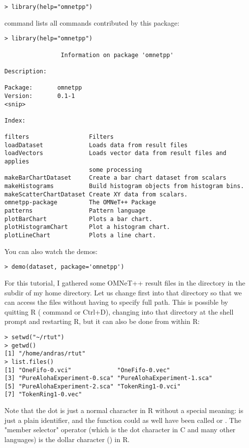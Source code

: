 \begin{verbatim}
> library(help="omnetpp")
\end{verbatim}

command lists all commands contributed by this package:

\begin{verbatim}
> library(help="omnetpp")

                Information on package 'omnetpp'

Description:

Package:       omnetpp
Version:       0.1-1
<snip>

Index:

filters                 Filters
loadDataset             Loads data from result files
loadVectors             Loads vector data from result files and applies
                        some processing
makeBarChartDataset     Create a bar chart dataset from scalars
makeHistograms          Build histogram objects from histogram bins.
makeScatterChartDataset Create XY data from scalars.
omnetpp-package         The OMNeT++ Package
patterns                Pattern language
plotBarChart            Plots a bar chart.
plotHistogramChart      Plot a histogram chart.
plotLineChart           Plots a line chart.
\end{verbatim}

You can also watch the demos:

\begin{verbatim}
> demo(dataset, package='omnetpp')
\end{verbatim}

For this tutorial, I gathered some OMNeT++ result files in the directory
in the  subdir of my home directory. Let us change first into that
directory so that we can access the files without having to specify
full path. This is possible by quitting R ( command or Ctrl+D),
changing into that directory at the shell prompt and restarting R,
but it can also be done from within R:

\begin{verbatim}
> setwd("~/rtut")
> getwd()
[1] "/home/andras/rtut"
> list.files()
[1] "OneFifo-0.vci"             "OneFifo-0.vec"
[3] "PureAlohaExperiment-0.sca" "PureAlohaExperiment-1.sca"
[5] "PureAlohaExperiment-2.sca" "TokenRing1-0.vci"
[7] "TokenRing1-0.vec"
\end{verbatim}

Note that the dot is just a normal character in R without a special meaning:
 is just a plain identifier, and the function could as well
have been called  or . The "member selector"
operator (which is the dot character in C and many other languages) is the
dollar character (\ttt{\$}) in R.

